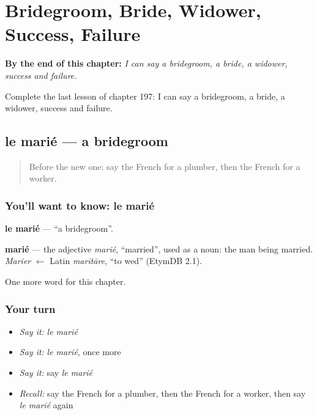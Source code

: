 
\chapter{Bridegroom, Bride, Widower, Success, Failure}
\label{ch:fr-bridegroom-bride-widower-success-failure}

\begin{chapteropening}
\textbf{By the end of this chapter:} \emph{I can say a bridegroom, a bride, a widower, success and failure.}

Complete the last lesson of chapter 197: I can say a bridegroom, a bride, a widower, success and failure.
\end{chapteropening}

\section[le marié]{le marié — a bridegroom}

\label{lesson:FR-C197-marie}



\begin{quote}
Before the new one: say the French for a plumber, then the French for a worker.
\end{quote}

\subsection*{You'll want to know: le marié}
\textbf{le marié} — \textquotedblleft{}a bridegroom\textquotedblright{}.

\begin{cousinweb}
\textbf{marié} — the adjective \emph{marié}, \textquotedblleft{}married\textquotedblright{}, used as a noun: the man being married. \emph{Marier} $\leftarrow$ Latin \emph{marītāre}, \textquotedblleft{}to wed\textquotedblright{} (EtymDB 2.1).
\end{cousinweb}

\begin{grammarlens}[title={What you've built}]
One more word for this chapter.
\end{grammarlens}

\subsection*{Your turn}
\begin{itemize}
\raggedright
  \item \emph{Say it:} \emph{le marié}
  \item \emph{Say it:} \emph{le marié}, once more
  \item \emph{Say it:} say \emph{le marié}
  \item \emph{Recall:} say the French for a plumber, then the French for a worker, then say \emph{le marié} again
\end{itemize}

